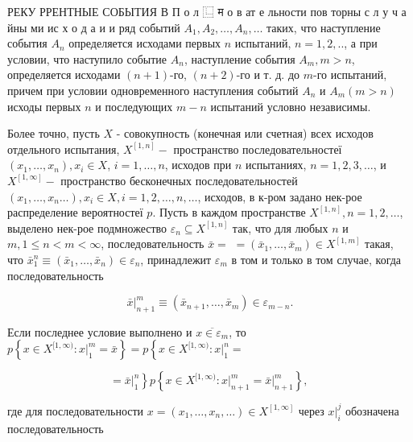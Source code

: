 \documentclass[10pt]{article}
\begin{document}
РЕКУ РРЕНТНЫЕ СОБЫТИЯ В П о л $\mathrm{⿺}$ म $о$ в ат е льности пов торны с л у ч а йны ми ис х о д а и и ряд событий $A_{1}, A_{2}, \ldots, A_{n}, \ldots$ таких, что наступление события $A_{n}$ определяется исходами первых $n$ испытаний, $n=1,2, . .$, а при условии, что наступило событие $A_{n}$, наступление события $A_{m}, m>n$, определяется исходами $(n+1)$-го, $(n+2)$-го и т. д. до $m$-го испытаний, причем при условии одновременного наступления событий $A_{n}$ и $A_{m}(m>n)$ исходы первых $n$ и последующих $m-n$ испытаний условно независимы.



Более точно, пусть $X$ - совокупность (конечная или счетная) всех исходов отдельного испытания, $X^{[1, n]}-$ пространство последовательностеї $\left(x_{1}, \ldots, x_{n}\right), x_{i} \in X$, $i=1, \ldots, n$, исходов при $n$ испытаниях, $n=1,2,3, \ldots$, и $X^{[1, \infty]}-$ пространство бесконечных последовательностей $\left(x_{1}, \ldots, x_{n} \ldots\right), x_{i} \in X, i=1,2, \ldots, n, \ldots$, исходов, в к-ром задано нек-рое распределение вероятностеї $p$. Пусть в каждом пространстве $X^{[1, n]}, n=1,2, \ldots$, выделено нек-рое подмножество $\varepsilon_{n} \subseteq X^{[1, n]}$ так, что для любых $n$ и $m, 1 \leqslant n<m<\infty$, последовательность $\bar{x}=$ $=\left(\bar{x}_{1}, \ldots, \bar{x}_{m}\right) \in X^{[1, m]}$ такая, что $\bar{x}_{1}^{n} \equiv\left(\bar{x}_{1}, \ldots, \bar{x}_{n}\right) \in \varepsilon_{n}$, принадлежит $\varepsilon_{m}$ в том и только в том случае, когда последовательность



\[

\left.\bar{x}\right|_{n+1} ^{m} \equiv\left(\bar{x}_{n+1}, \ldots, \bar{x}_{m}\right) \in \varepsilon_{m-n} .

\]



Если последнее условие выполнено и $\overline{x \in \varepsilon_{m}}$, то $p\left\{x \in X^{[1, \infty)}:\left.x\right|_{1} ^{m}=\bar{x}\right\}=p\left\{x \in X^{[1, \infty)}:\left.x\right|_{1} ^{n}=\right.$



\[

\left.=\left.\bar{x}\right|_{1} ^{n}\right\} p\left\{x \in X^{[1, \infty)}:\left.x\right|_{n+1} ^{m}=\left.\bar{x}\right|_{n+1} ^{m}\right\} \text {, }

\]



где для последовательности $x=\left(x_{1}, \ldots, x_{n}, \ldots\right) \in X^{[1, \infty]}$ через $\left.x\right|_{i} ^{j}$ обозначена последовательность
\end{document}
